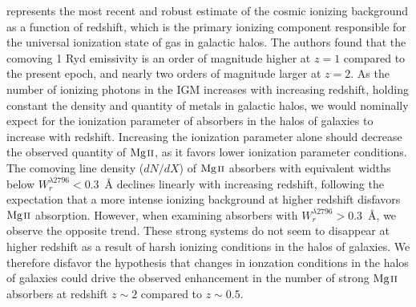 \documentclass[iop,apj,numberedappendix,appendixfloats,twocolappendix]{emulateapj}
\begin{document}
\cite{Haardt2012} represents the most recent and robust estimate of the cosmic ionizing background as a function of redshift, which is the primary ionizing component responsible for the universal ionization state of gas in galactic halos. The authors found that the comoving 1 Ryd emissivity is an order of magnitude higher at $z = 1$ compared to the present epoch, and nearly two orders of magnitude larger at $z = 2$. As the number of ionizing photons in the IGM increases with increasing redshift, holding constant the density and quantity of metals in galactic halos, we would nominally expect for the ionization parameter of absorbers in the halos of galaxies to increase with redshift. Increasing the ionization parameter alone should decrease the observed quantity of ${\hbox{{\rm Mg}\kern 0.1em{\sc ii}}}$, as it favors lower ionization parameter conditions. The comoving line density ($dN\!/dX$) of ${\hbox{{\rm Mg}\kern 0.1em{\sc ii}}}$ absorbers with equivalent widths below $W_r^{\lambda2796} < 0.3$~{\AA} declines linearly with increasing redshift, following the expectation that a more intense ionizing background at higher redshift disfavors ${\hbox{{\rm Mg}\kern 0.1em{\sc ii}}}$ absorption. However, when examining absorbers with $W_r^{\lambda2796} > 0.3$~{\AA}, we observe the opposite trend. These strong systems do not seem to disappear at higher redshift as a result of harsh ionizing conditions in the halos of galaxies. We therefore disfavor the hypothesis that changes in ionzation conditions in the halos of galaxies could drive the observed enhancement in the number of strong ${\hbox{{\rm Mg}\kern 0.1em{\sc ii}}}$ absorbers at redshift $z \sim 2$ compared to $z \sim 0.5$. 
\end{document}
